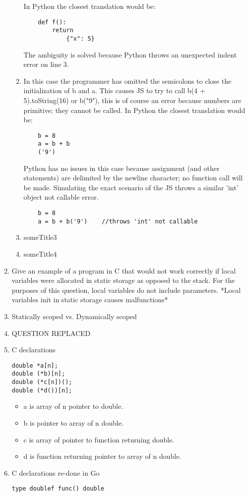\documentclass{article}
\begin{document}
\begin{enumerate}
\begin{enumerate}
    In Python the closest translation would be:
    \begin{verbatim}
    def f():
        return
            {"x": 5}    
    \end{verbatim}
    The ambiguity is solved because Python throws an unexpected indent error on line 3.
    \item In this case the programmer has omitted the semicolons to close the initialization of b and a. This causes JS to try to call b(4 + 5).toString(16) or b("9"), this is of course an error because numbers are primitive; they cannot be called.
    In Python the closest translation would be:
    \begin{verbatim}
    b = 8
    a = b + b
    ('9')
    \end{verbatim}
    Python has no issues in this case because assignment (and other statements) are delimited by the newline character; no function call will be made. Simulating the exact scenario of the JS throws a similar 'int' object not callable error.
    \begin{verbatim}
    b = 8
    a = b + b('9')    //throws 'int' not callable
    \end{verbatim}
    \item someTitle3
    \item someTitle4
\end{enumerate}
\pagebreak
\item Give an example of a program in C that would not work correctly if local variables were allocated in static storage as opposed to the stack. For the purposes of this question, local variables do not include parameters. *Local variables init in static storage causes malfunctions*
\pagebreak
\item Statically scoped vs. Dynamically scoped
\pagebreak
\item QUESTION REPLACED 
\pagebreak
\item C declarations
\begin{verbatim}
double *a[n];  
double (*b)[n];
double (*c[n])();
double (*d())[n];
\end{verbatim}
\begin{itemize}
    \item a is array of n pointer to double.
    \item b is pointer to array of n double.
    \item c is array of pointer to function returning double.
    \item d is function returning pointer to array of n double.
\end{itemize}
\pagebreak
\item C declarations re-done in Go
\begin{verbatim}
type doublef func() double


\end{verbatim}
\end{enumerate}
\end{document}
